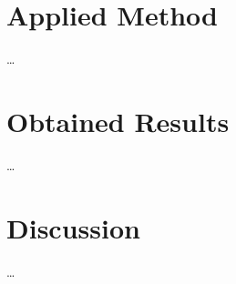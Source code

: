 \documentclass[sigconf, nonacm]{acmart}
\begin{document}
\section{Applied Method}
\label{applied_methods}

\ldots

\section{Obtained Results}
\label{obtained_results}

\ldots

\section{Discussion}
\label{discussion}

\ldots



\end{document}

